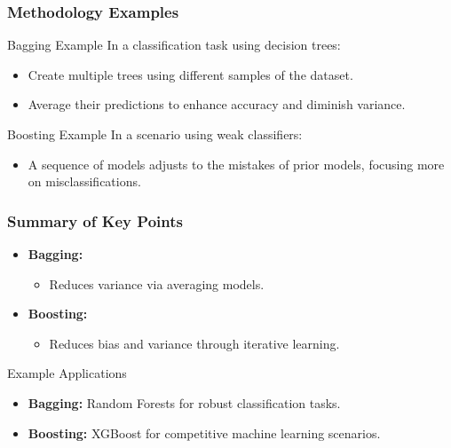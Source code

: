 \documentclass[aspectratio=169]{beamer}
\begin{document}
\begin{frame}[fragile]
    \frametitle{Methodology Examples}
    \begin{block}{Bagging Example}
        In a classification task using decision trees:
        \begin{itemize}
            \item Create multiple trees using different samples of the dataset.
            \item Average their predictions to enhance accuracy and diminish variance.
        \end{itemize}
    \end{block}

    \begin{block}{Boosting Example}
        In a scenario using weak classifiers:
        \begin{itemize}
            \item A sequence of models adjusts to the mistakes of prior models, focusing more on misclassifications.
        \end{itemize}
    \end{block}
\end{frame}

\begin{frame}[fragile]
    \frametitle{Summary of Key Points}
    \begin{itemize}
        \item \textbf{Bagging:} 
        \begin{itemize}
            \item Reduces variance via averaging models.
        \end{itemize}
        \item \textbf{Boosting:} 
        \begin{itemize}
            \item Reduces bias and variance through iterative learning.
        \end{itemize}
    \end{itemize}
    
    \begin{block}{Example Applications}
        \begin{itemize}
            \item \textbf{Bagging:} Random Forests for robust classification tasks.
            \item \textbf{Boosting:} XGBoost for competitive machine learning scenarios.
        \end{itemize}
    \end{block}
\end{frame}
\end{document}
